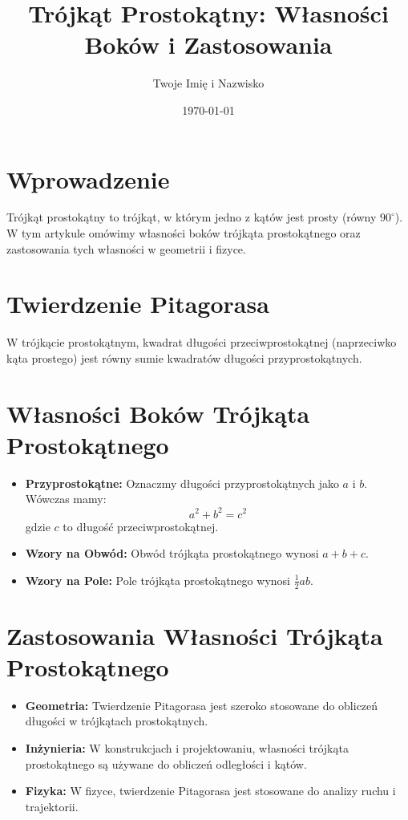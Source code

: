 \documentclass[12pt]{article}
\title{Trójkąt Prostokątny: Własności Boków i Zastosowania}
\author{Twoje Imię i Nazwisko}
\date{\today}
\begin{document}
\maketitle

\section{Wprowadzenie}
Trójkąt prostokątny to trójkąt, w którym jedno z kątów jest prosty (równy $90^\circ$). W tym artykule omówimy własności boków trójkąta prostokątnego oraz zastosowania tych własności w geometrii i fizyce.

\section{Twierdzenie Pitagorasa}
\begin{theorem}
W trójkącie prostokątnym, kwadrat długości przeciwprostokątnej (naprzeciwko kąta prostego) jest równy sumie kwadratów długości przyprostokątnych.
\end{theorem}

\section{Własności Boków Trójkąta Prostokątnego}
\begin{itemize}
  \item \textbf{Przyprostokątne:} Oznaczmy długości przyprostokątnych jako $a$ i $b$. Wówczas mamy:
  \[
  a^2 + b^2 = c^2
  \]
  gdzie $c$ to długość przeciwprostokątnej.
  
  \item \textbf{Wzory na Obwód:} Obwód trójkąta prostokątnego wynosi $a + b + c$.
  
  \item \textbf{Wzory na Pole:} Pole trójkąta prostokątnego wynosi $\frac{1}{2}ab$.
\end{itemize}

\section{Zastosowania Własności Trójkąta Prostokątnego}
\begin{itemize}
  \item \textbf{Geometria:} Twierdzenie Pitagorasa jest szeroko stosowane do obliczeń długości w trójkątach prostokątnych.
  
  \item \textbf{Inżynieria:} W konstrukcjach i projektowaniu, własności trójkąta prostokątnego są używane do obliczeń odległości i kątów.
  
  \item \textbf{Fizyka:} W fizyce, twierdzenie Pitagorasa jest stosowane do analizy ruchu i trajektorii.
\end{itemize}
\end{document}

